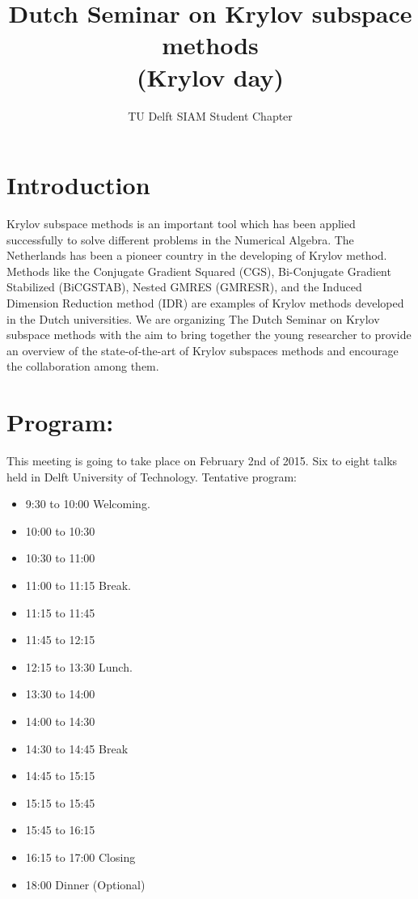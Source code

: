 \documentclass{article}
\title{Dutch Seminar on Krylov subspace methods \\(Krylov day)}
\author{TU Delft SIAM Student Chapter}
\begin{document}
\maketitle
\section{Introduction}
Krylov subspace methods is an important tool which has been applied successfully to solve different problems 
in the Numerical Algebra. The Netherlands has been a pioneer country in the developing of Krylov method.
Methods like the Conjugate Gradient Squared (CGS), Bi-Conjugate Gradient Stabilized (BiCGSTAB), Nested GMRES (GMRESR), and the Induced Dimension Reduction method (IDR)  
are examples of Krylov methods developed in the Dutch universities. 
We are organizing The Dutch Seminar on Krylov subspace methods with the aim 
to bring together the young researcher to provide an
overview of the state-of-the-art of Krylov subspaces methods and encourage 
the collaboration among them.
\newpage
\section{Program:}
This meeting is going to take place on February 2nd of 2015. Six to eight talks held in Delft University of Technology. 
Tentative program:
\begin{itemize}
\item 9:30 to 10:00 Welcoming. 
\item 10:00 to 10:30 
\item 10:30 to 11:00 
\item 11:00 to 11:15 Break.
\item 11:15 to 11:45
\item 11:45 to 12:15
\item 12:15 to 13:30 Lunch.
\item 13:30 to 14:00 
\item 14:00 to 14:30 
\item 14:30 to 14:45 Break 
\item 14:45 to 15:15 
\item 15:15 to 15:45 
\item 15:45 to 16:15 
\item 16:15 to 17:00 Closing
\item 18:00 Dinner (Optional) 
\end{itemize}
\newpage
\end{document}
